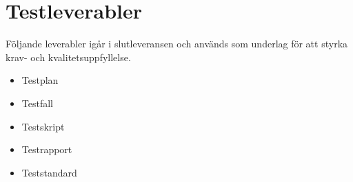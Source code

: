 \section{Testleverabler}
Följande leverabler igår i slutleveransen och används som underlag för att styrka krav- och kvalitetsuppfyllelse.
\begin{itemize}
\item Testplan
\item Testfall
\item Testskript
\item Testrapport
\item Teststandard
\end{itemize}